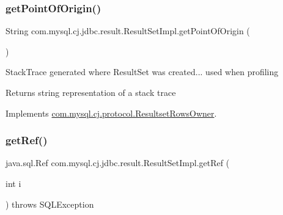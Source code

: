 \subsubsection{\texorpdfstring{get\+Point\+Of\+Origin()}{getPointOfOrigin()}}
{\footnotesize\ttfamily String com.\+mysql.\+cj.\+jdbc.\+result.\+Result\+Set\+Impl.\+get\+Point\+Of\+Origin (\begin{DoxyParamCaption}{ }\end{DoxyParamCaption})}

Stack\+Trace generated where Result\+Set was created... used when profiling

\begin{DoxyReturn}{Returns}
string representation of a stack trace 
\end{DoxyReturn}


Implements \mbox{\hyperlink{interfacecom_1_1mysql_1_1cj_1_1protocol_1_1_resultset_rows_owner_ae8c8b074a381de4bf3b25dc53e4ee079}{com.\+mysql.\+cj.\+protocol.\+Resultset\+Rows\+Owner}}.

\mbox{\label{classcom_1_1mysql_1_1cj_1_1jdbc_1_1result_1_1_result_set_impl_a861229b18588fc13fa9e7996666c2afc}} 
\subsubsection{\texorpdfstring{get\+Ref()}{getRef()}\hspace{0.1cm}{\footnotesize\ttfamily [1/2]}}
{\footnotesize\ttfamily java.\+sql.\+Ref com.\+mysql.\+cj.\+jdbc.\+result.\+Result\+Set\+Impl.\+get\+Ref (\begin{DoxyParamCaption}\item[{int}]{i }\end{DoxyParamCaption}) throws S\+Q\+L\+Exception}

\mbox{\label{classcom_1_1mysql_1_1cj_1_1jdbc_1_1result_1_1_result_set_impl_a4311c8f11b6fdf58d57ff04a75955643}} 
